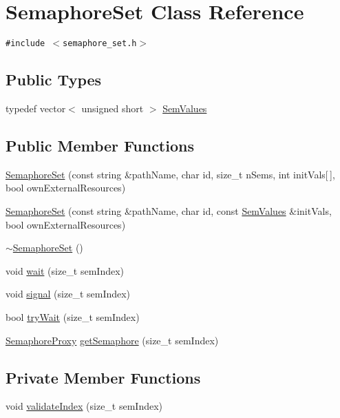 \hypertarget{classSemaphoreSet}{
\section{SemaphoreSet Class Reference}
\label{classSemaphoreSet}
}
{\tt \#include $<$semaphore\_\-set.h$>$}

\subsection*{Public Types}
\begin{CompactItemize}
\item 
typedef vector$<$ unsigned short $>$ \hyperlink{classSemaphoreSet_9b4df28695eed6584fe24549b9f8c446}{SemValues}
\end{CompactItemize}
\subsection*{Public Member Functions}
\begin{CompactItemize}
\item 
\hyperlink{classSemaphoreSet_e7e1a5ffbb4649ea33100304d7c3c94c}{SemaphoreSet} (const string \&pathName, char id, size\_\-t nSems, int initVals\mbox{[}$\,$\mbox{]}, bool ownExternalResources)
\item 
\hyperlink{classSemaphoreSet_f2442ffd5943a17f45d54b43e1aaeddc}{SemaphoreSet} (const string \&pathName, char id, const \hyperlink{classSemaphoreSet_9b4df28695eed6584fe24549b9f8c446}{SemValues} \&initVals, bool ownExternalResources)
\item 
\hyperlink{classSemaphoreSet_39f813371f0f7bcf1c826619b69ee818}{$\sim$SemaphoreSet} ()
\item 
void \hyperlink{classSemaphoreSet_e298eb7aad5d7d0e359e6450c5dd9a0e}{wait} (size\_\-t semIndex)
\item 
void \hyperlink{classSemaphoreSet_d4916e65fcf8c371854f5953c124b93f}{signal} (size\_\-t semIndex)
\item 
bool \hyperlink{classSemaphoreSet_3113cf6993941fb46821140793654b14}{tryWait} (size\_\-t semIndex)
\item 
\hyperlink{classSemaphoreProxy}{SemaphoreProxy} \hyperlink{classSemaphoreSet_7dc423792f197e57034c69a708194cd5}{getSemaphore} (size\_\-t semIndex)
\end{CompactItemize}
\subsection*{Private Member Functions}
\begin{CompactItemize}
\item 
void \hyperlink{classSemaphoreSet_d0d136c5b0c87651ba33ed407c8df3f1}{validateIndex} (size\_\-t semIndex)
\end{CompactItemize}
